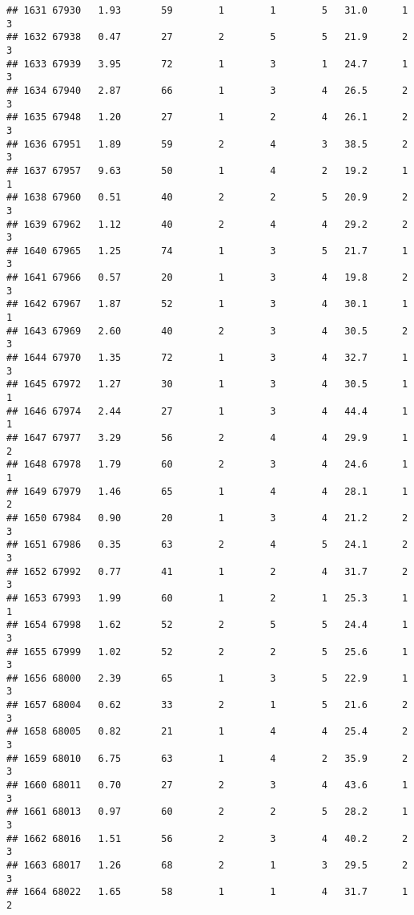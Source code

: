 \documentclass[
]{article}
\begin{document}
\begin{verbatim}
## 1631 67930   1.93       59        1        1        5   31.0      1      3
## 1632 67938   0.47       27        2        5        5   21.9      2      3
## 1633 67939   3.95       72        1        3        1   24.7      1      3
## 1634 67940   2.87       66        1        3        4   26.5      2      3
## 1635 67948   1.20       27        1        2        4   26.1      2      3
## 1636 67951   1.89       59        2        4        3   38.5      2      3
## 1637 67957   9.63       50        1        4        2   19.2      1      1
## 1638 67960   0.51       40        2        2        5   20.9      2      3
## 1639 67962   1.12       40        2        4        4   29.2      2      3
## 1640 67965   1.25       74        1        3        5   21.7      1      3
## 1641 67966   0.57       20        1        3        4   19.8      2      3
## 1642 67967   1.87       52        1        3        4   30.1      1      1
## 1643 67969   2.60       40        2        3        4   30.5      2      3
## 1644 67970   1.35       72        1        3        4   32.7      1      3
## 1645 67972   1.27       30        1        3        4   30.5      1      1
## 1646 67974   2.44       27        1        3        4   44.4      1      1
## 1647 67977   3.29       56        2        4        4   29.9      1      2
## 1648 67978   1.79       60        2        3        4   24.6      1      1
## 1649 67979   1.46       65        1        4        4   28.1      1      2
## 1650 67984   0.90       20        1        3        4   21.2      2      3
## 1651 67986   0.35       63        2        4        5   24.1      2      3
## 1652 67992   0.77       41        1        2        4   31.7      2      3
## 1653 67993   1.99       60        1        2        1   25.3      1      1
## 1654 67998   1.62       52        2        5        5   24.4      1      3
## 1655 67999   1.02       52        2        2        5   25.6      1      3
## 1656 68000   2.39       65        1        3        5   22.9      1      3
## 1657 68004   0.62       33        2        1        5   21.6      2      3
## 1658 68005   0.82       21        1        4        4   25.4      2      3
## 1659 68010   6.75       63        1        4        2   35.9      2      3
## 1660 68011   0.70       27        2        3        4   43.6      1      3
## 1661 68013   0.97       60        2        2        5   28.2      1      3
## 1662 68016   1.51       56        2        3        4   40.2      2      3
## 1663 68017   1.26       68        2        1        3   29.5      2      3
## 1664 68022   1.65       58        1        1        4   31.7      1      2

\end{verbatim}
\end{document}
